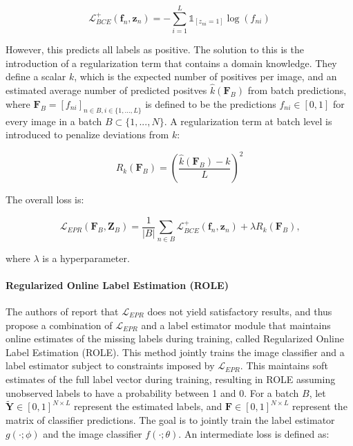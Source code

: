 \documentclass[lettersize,journal]{IEEEtran}
\begin{document}
\begin{equation}
    \mathcal{L}_{BCE}^+(\mathbf{f}_n,\mathbf{z}_n) = - \sum_{i=1}^{L}\mathds{1}_{[z_{ni}=1]}\log(f_{ni})
\end{equation}

However, this predicts all labels as positive. The solution to this is the introduction of a regularization term that contains a domain knowledge. They define a scalar $k$, which is the expected number of positives per image, and an estimated average number of predicted positves $\hat{k}(\mathbf{F}_B)$ from batch predictions, where $\mathbf{F}_B = [f_{ni}]_{n\in B,i\in\{1,...,L\}}$ is defined to be the predictions $f_{ni}\in[0,1]$ for every image in a batch $B\subset \{1,...,N\}$. A regularization term at batch level is introduced to penalize deviations from $k$:

\begin{equation}
    R_k(\mathbf{F}_B) = \left(\frac{\hat{k}(\mathbf{F}_B)-k}{L}\right)^2
\end{equation}

\noindent The overall loss is:

\begin{equation}
    \mathcal{L}_{EPR}(\mathbf{F}_B,\mathbf{Z}_B) = \frac{1}{|B|}\sum_{n\in B}\mathcal{L}_{BCE}^+(\mathbf{f}_n,\mathbf{z}_n)+\lambda R_k(\mathbf{F}_B)\text{,}
\end{equation}

where $\lambda$ is a hyperparameter.


\paragraph{Regularized Online Label Estimation (ROLE)}
The authors of \cite{mlsp} report that $\mathcal{L}_{EPR}$ does not yield satisfactory results, and thus propose a combination of $\mathcal{L}_{EPR}$ and a label estimator module that maintains online estimates of the missing labels during training, called Regularized Online Label Estimation (ROLE). This method jointly trains the image classifier and a label estimator subject to constraints imposed by $\mathcal{L}_{EPR}$. This maintains soft estimates of the full label vector during training, resulting in ROLE assuming unobserved labels to have a probability between 1 and 0. For a batch $B$, let $\mathbf{\tilde{Y}}\in[0,1]^{N\times L}$ represent the estimated labels, and $\mathbf{F}\in[0,1]^{N\times L}$ represent the matrix of classifier predictions. The goal is to jointly train the label estimator $g(\cdot;\phi)$ and the image classifier $f(\cdot;\theta)$. An intermediate loss is defined as:
\end{document}
